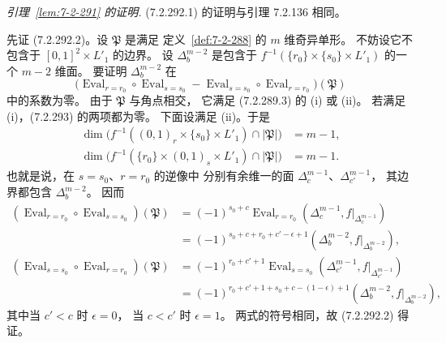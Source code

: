 
\par\noindent\textit{引理~\ref{lem:7-2-291} 的证明.}\quad
(7.2.292.1) 的证明与引理 7.2.136 相同。

先证 (7.2.292.2)。设 $\mathfrak P$ 是满足
定义~\ref{def:7-2-288} 的 $m$ 维奇异单形。
不妨设它不包含于
$[0,1]^2\times L'_1$ 的边界。
设 $\Delta_b^{m-2}$ 是包含于
$f^{-1}(\{r_0\}\times\{s_0\}\times L'_1)$
的一个 $m-2$ 维面。
要证明 $\Delta_b^{m-2}$ 在
\begin{equation}
\bigl(\operatorname{Eval}_{r=r_0}\circ
\operatorname{Eval}_{s=s_0}
-\operatorname{Eval}_{s=s_0}\circ
\operatorname{Eval}_{r=r_0}\bigr)(\mathfrak P)
\tag{7.2.293}\label{eq:7-2-293}
\end{equation}
中的系数为零。
由于 $\mathfrak P$ 与角点相交，
它满足 (7.2.289.3) 的 (i) 或 (ii)。
若满足 (i)，(7.2.293) 的两项都为零。
下面设满足 (ii)。于是
\[
\begin{aligned}
\dim\bigl(f^{-1}((0,1)_r\times\{s_0\}\times L'_1)
\cap|\mathfrak P|\bigr)
&=m-1,\\
\dim\bigl(f^{-1}(\{r_0\}\times(0,1)_s\times L'_1)
\cap|\mathfrak P|\bigr)
&=m-1.
\end{aligned}
\]
也就是说，在 $s=s_0$、$r=r_0$ 的逆像中
分别有余维一的面
$\Delta_c^{m-1}$、$\Delta_{c'}^{m-1}$，
其边界都包含 $\Delta_b^{m-2}$。
因而
\[
\begin{aligned}
(\operatorname{Eval}_{r=r_0}\circ
\operatorname{Eval}_{s=s_0})(\mathfrak P)
&=(-1)^{s_0+c}
\operatorname{Eval}_{r=r_0}
(\Delta_c^{m-1},f|_{\Delta_c^{m-1}})\\
&=(-1)^{s_0+c+r_0+c'-\epsilon+1}
(\Delta_b^{m-2},f|_{\Delta_b^{m-2}}),\\
(\operatorname{Eval}_{s=s_0}\circ
\operatorname{Eval}_{r=r_0})(\mathfrak P)
&=(-1)^{r_0+c'+1}
\operatorname{Eval}_{s=s_0}
(\Delta_{c'}^{m-1},f|_{\Delta_{c'}^{m-1}})\\
&=(-1)^{r_0+c'+1+s_0+c-(1-\epsilon)+1}
(\Delta_b^{m-2},f|_{\Delta_b^{m-2}}),
\end{aligned}
\]
其中当 $c'<c$ 时 $\epsilon=0$，
当 $c<c'$ 时 $\epsilon=1$。
两式的符号相同，故 (7.2.292.2) 得证。

